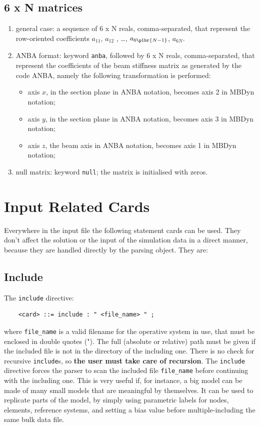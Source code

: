 \documentclass[10pt,dvips]{report}
\begin{document}
\subsection{6 x N matrices}
\begin{enumerate}
    \item general case: a sequence of 6 x N reals, comma-separated, that
    represent the row-oriented coefficients $ a_{11} $, $ a_{12}$ ,
    \ldots, $ a_{6\plbr{N-1}} $, $ a_{6N} $.
    \item ANBA format: keyword {\tt anba}, followed by 6 x N reals,
    comma-separated, that represent the coefficients of the beam stiffness
    matrix as generated by the code ANBA, namely the following
    transformation is performed:
    \begin{itemize}
        \item axis $ x $, in the section plane in ANBA notation, 
	becomes axis 2 in MBDyn notation;    
	\item axis $ y $, in the section plane in ANBA notation, 
	becomes axis 3 in MBDyn notation;    
	\item axis $ z $, the beam axis in ANBA notation, 
	becomes axis 1 in MBDyn notation;    
    \end{itemize}
    \item null matrix: keyword {\tt null}; the matrix is initialised 
    with zeros.
\end{enumerate}


\section{Input Related Cards} 
Everywhere in the input file the following statement cards can be used.
They don't affect the solution or the input of the simulation data in a
direct manner, because they are handled directly by the parsing object.
They are:

\subsection{Include}
The {\tt include} directive:
\begin{verbatim}
    <card> ::= include : " <file_name> " ;
\end{verbatim}
where {\tt file\_name} is a valid filename for the operative system in
use, that must be enclosed in double quotes (").
The full (absolute or relative) path must be given if the included file 
is not in the directory of the including one.
There is no check for recursive {\tt include}s, so 
{\bf the user must take care of recursion}.
The {\tt include} directive forces the parser to scan the included file
{\tt file\_name} before continuing with the including one.
This is very useful if, for instance, a big model can be made of many
small models that are meaningful by themselves. It can be used to
replicate parts of the model, by simply using parametric labels for
nodes, elements, reference systems, and setting a bias value before 
multiple-including the same bulk data file.
\end{document}
